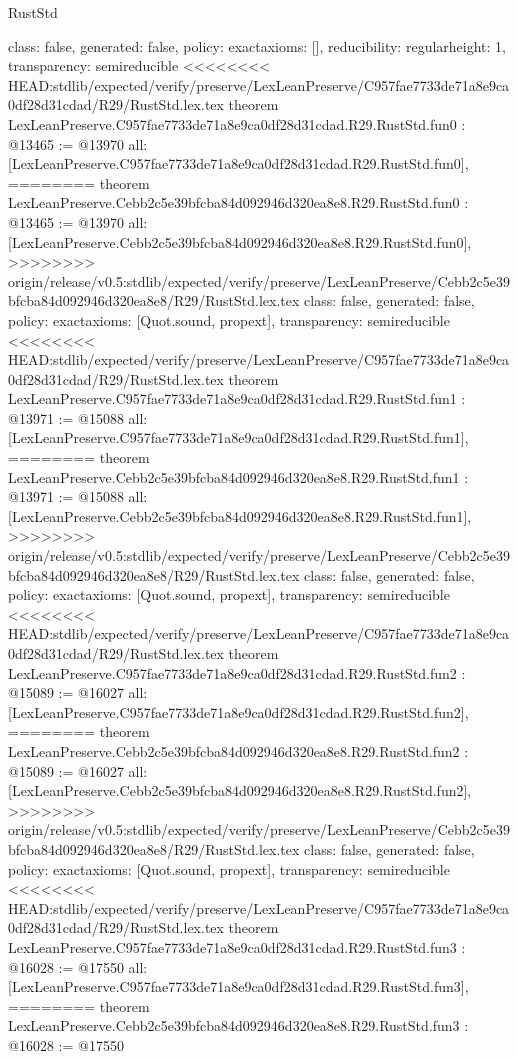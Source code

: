 \begin{lexlean}{RustStd}
\begin{coremodule}
{\begin{coremodule}
{{{  class: false,
  generated: false,
  policy: exact{axioms: []},
  reducibility: regular{height: 1},
  transparency: semireducible
}
<<<<<<<< HEAD:stdlib/expected/verify/preserve/LexLeanPreserve/C957fae7733de71a8e9ca0df28d31cdad/R29/RustStd.lex.tex
theorem LexLeanPreserve.C957fae7733de71a8e9ca0df28d31cdad.R29.RustStd.fun0 : @13465 := @13970 {
  all: [LexLeanPreserve.C957fae7733de71a8e9ca0df28d31cdad.R29.RustStd.fun0],
========
theorem LexLeanPreserve.Cebb2c5e39bfcba84d092946d320ea8e8.R29.RustStd.fun0 : @13465 := @13970 {
  all: [LexLeanPreserve.Cebb2c5e39bfcba84d092946d320ea8e8.R29.RustStd.fun0],
>>>>>>>> origin/release/v0.5:stdlib/expected/verify/preserve/LexLeanPreserve/Cebb2c5e39bfcba84d092946d320ea8e8/R29/RustStd.lex.tex
  class: false,
  generated: false,
  policy: exact{axioms: [Quot.sound, propext]},
  transparency: semireducible
}
<<<<<<<< HEAD:stdlib/expected/verify/preserve/LexLeanPreserve/C957fae7733de71a8e9ca0df28d31cdad/R29/RustStd.lex.tex
theorem LexLeanPreserve.C957fae7733de71a8e9ca0df28d31cdad.R29.RustStd.fun1 : @13971 := @15088 {
  all: [LexLeanPreserve.C957fae7733de71a8e9ca0df28d31cdad.R29.RustStd.fun1],
========
theorem LexLeanPreserve.Cebb2c5e39bfcba84d092946d320ea8e8.R29.RustStd.fun1 : @13971 := @15088 {
  all: [LexLeanPreserve.Cebb2c5e39bfcba84d092946d320ea8e8.R29.RustStd.fun1],
>>>>>>>> origin/release/v0.5:stdlib/expected/verify/preserve/LexLeanPreserve/Cebb2c5e39bfcba84d092946d320ea8e8/R29/RustStd.lex.tex
  class: false,
  generated: false,
  policy: exact{axioms: [Quot.sound, propext]},
  transparency: semireducible
}
<<<<<<<< HEAD:stdlib/expected/verify/preserve/LexLeanPreserve/C957fae7733de71a8e9ca0df28d31cdad/R29/RustStd.lex.tex
theorem LexLeanPreserve.C957fae7733de71a8e9ca0df28d31cdad.R29.RustStd.fun2 : @15089 := @16027 {
  all: [LexLeanPreserve.C957fae7733de71a8e9ca0df28d31cdad.R29.RustStd.fun2],
========
theorem LexLeanPreserve.Cebb2c5e39bfcba84d092946d320ea8e8.R29.RustStd.fun2 : @15089 := @16027 {
  all: [LexLeanPreserve.Cebb2c5e39bfcba84d092946d320ea8e8.R29.RustStd.fun2],
>>>>>>>> origin/release/v0.5:stdlib/expected/verify/preserve/LexLeanPreserve/Cebb2c5e39bfcba84d092946d320ea8e8/R29/RustStd.lex.tex
  class: false,
  generated: false,
  policy: exact{axioms: [Quot.sound, propext]},
  transparency: semireducible
}
<<<<<<<< HEAD:stdlib/expected/verify/preserve/LexLeanPreserve/C957fae7733de71a8e9ca0df28d31cdad/R29/RustStd.lex.tex
theorem LexLeanPreserve.C957fae7733de71a8e9ca0df28d31cdad.R29.RustStd.fun3 : @16028 := @17550 {
  all: [LexLeanPreserve.C957fae7733de71a8e9ca0df28d31cdad.R29.RustStd.fun3],
========
theorem LexLeanPreserve.Cebb2c5e39bfcba84d092946d320ea8e8.R29.RustStd.fun3 : @16028 := @17550 {
}}}}}}}
\end{coremodule}}
\end{coremodule}
\end{lexlean}
